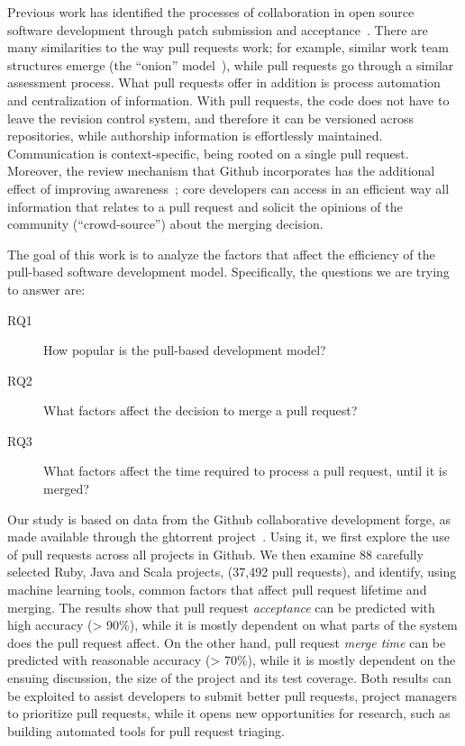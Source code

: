 \documentclass{acm_proc_article-sp}
\begin{document}
Previous work has identified the processes of collaboration in open source
software development through patch submission and acceptance~\cite{MOCKU02,
Bird07, Weiss08}. There are many similarities to the way pull requests work; for
example, similar work team structures emerge (the ``onion''
model~\cite{Crows05}), while pull requests go through a similar assessment
process. What pull requests offer in addition is process automation and
centralization of information. With pull requests, the code does not have to
leave the revision control system, and therefore it can be versioned across
repositories, while authorship information is effortlessly maintained.
Communication is context-specific, being rooted on a single pull request.
Moreover, the review mechanism that Github incorporates has the additional
effect of improving awareness~\cite{Dabbi12}; core developers can access in an
efficient way all information that relates to a pull request and solicit the
opinions of the community (``crowd-source'') about the merging decision.

The goal of this work is to analyze the factors that affect the efficiency
of the pull-based software development model. Specifically, the questions we are trying to answer are: 

\begin{description}

  \item[RQ1] How popular is the pull-based development model?

  \item[RQ2] What factors affect the decision to merge a pull request?

  \item[RQ3] What factors affect the time required to process a pull request,
    until it is merged?

\end{description}

Our study is based on data from the Github collaborative development forge, as
made available through the {\sc ght}orrent project~\cite{GS12}. Using it, we first
explore the use of pull requests across all projects in Github. We then examine
88 carefully selected Ruby, Java and Scala projects, (37,492 pull requests), and
identify, using machine learning tools, common factors that affect pull request
lifetime and merging. The results show that pull request \emph{acceptance}
can be predicted with high accuracy (> 90\%), while it is mostly dependent on
what parts of the system does the pull request affect. On the other hand, pull
request \emph{merge time} can be predicted with reasonable accuracy (> 70\%),
while it is mostly dependent on the ensuing discussion, the size of the project
and its test coverage. Both results can be exploited to assist developers to
submit better pull requests, project managers to prioritize pull requests, while
it opens new opportunities for research, such as building automated tools for
pull request triaging.
\end{document}
